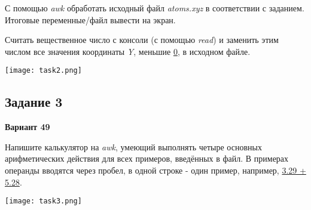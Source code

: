 \documentclass[12pt, a4paper]{report}
\begin{document}
	\par
	С помощью \textit{awk} обработать исходный файл \textit{atoms.xyz} в соответствии с заданием. Итоговые переменные/файл вывести на экран.
	\par
	Считать вещественное число с консоли (с помощью \textit{read}) и заменить этим числом все значения координаты \textit{Y}, меньшие \underline{0}, в исходном файле.
	\lstset{style=mystyle}
	
	
	\begin{center}
		\texttt{[image: task2.png]}
	\end{center}

	\subsection*{Задание 3}
	\large
	\begin{center}
		\textbf{Вариант 49}
	\end{center}
	\par
	Напишите калькулятор на \textit{awk}, умеющий выполнять четыре основных арифметических действия для всех примеров, введённых в файл. В примерах операнды вводятся через пробел, в одной строке - один пример, например, \underline{3.29 + 5.28}.
	\par
	\lstset{style=mystyle}
	
	
	
	\begin{center}
		\texttt{[image: task3.png]}
	\end{center}
\end{document}
